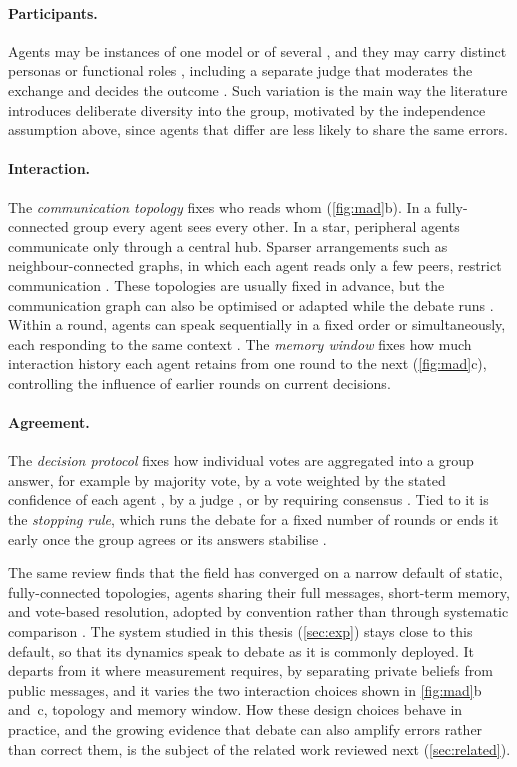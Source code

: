 \paragraph{Participants.}
Agents may be instances of one model or of several \citep{chen2024reconcile},
and they may carry distinct personas or functional roles
\citep{chan2024chateval}, including a separate judge that moderates the
exchange and decides the outcome \citep{liang2024encouraging}. Such variation
is the main way the literature introduces deliberate diversity into the
group, motivated by the independence assumption above, since agents that differ are
less likely to share the same errors.

\paragraph{Interaction.}
The \emph{communication topology} fixes who reads whom (\autoref{fig:mad}b). In
a fully-connected group every agent sees every other. In a star, peripheral
agents communicate only through a central hub. Sparser arrangements such as
neighbour-connected graphs, in which each agent reads only a few peers, restrict
communication \citep{li2024sparsetopology}.
These topologies are usually fixed in advance, but the communication graph can
also be optimised \citep{zhuge2024gptswarm} or adapted while the debate runs
\citep{liu2024dylan}. Within a round, agents can speak sequentially in a fixed
order or simultaneously, each responding to the same context
\citep{chan2024chateval}. The \emph{memory window} fixes how much interaction
history each agent retains from one round to the next (\autoref{fig:mad}c),
controlling the influence of earlier rounds on current decisions.

\paragraph{Agreement.}
The \emph{decision protocol} fixes how individual votes are aggregated into a
group answer, for example by majority vote, by a vote weighted by the stated
confidence of each agent \citep{chen2024reconcile}, by a judge \citep{liang2024encouraging},
or by requiring consensus \citep{kaesberg2025voting}. Tied to it is the
\emph{stopping rule}, which runs the debate for a fixed number of rounds or ends
it early once the group agrees or its answers stabilise
\citep{yin2023eot, hu2025stabilitydetection}.

The same review finds that the field has converged on a narrow default of
static, fully-connected topologies, agents sharing their full messages, short-term
memory, and vote-based resolution, adopted by convention rather than through systematic
comparison \citep{motger2026taxonomy}. The system studied in this thesis
(\autoref{sec:exp}) stays close to this default, so that its dynamics speak to
debate as it is commonly deployed. It departs from it where measurement
requires, by separating private beliefs from public messages, and it varies the
two interaction choices shown in \autoref{fig:mad}b and~c, topology and memory
window. How these design choices behave in practice, and the growing evidence
that debate can also amplify errors rather than correct them, is the subject of
the related work reviewed next (\autoref{sec:related}).